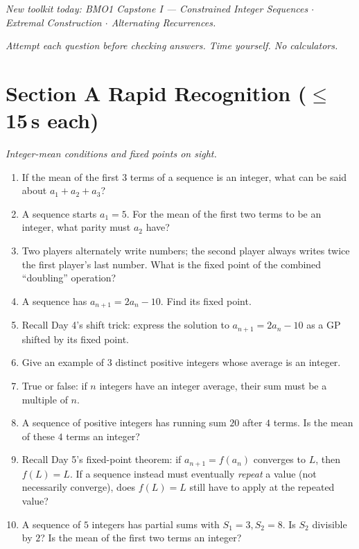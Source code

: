 \documentclass[11pt,a4paper]{article}
\begin{document}
\noindent\textit{New toolkit today: BMO1 Capstone I --- Constrained Integer Sequences $\cdot$ Extremal Construction $\cdot$ Alternating Recurrences.}

\vspace{2pt}
\noindent\textit{Attempt each question before checking answers. Time yourself. No calculators.}

\section*{Section A \quad Rapid Recognition \hfill{\normalfont\small($\leq$15\,s each)}}

\noindent\textit{Integer-mean conditions and fixed points on sight.}

\begin{enumerate}

\item If the mean of the first $3$ terms of a sequence is an integer, what can be said about $a_1+a_2+a_3$?

\item A sequence starts $a_1=5$. For the mean of the first two terms to be an integer, what parity must $a_2$ have?

\item Two players alternately write numbers; the second player always writes twice the first player's last number. What is the fixed point of the combined ``doubling'' operation?

\item A sequence has $a_{n+1}=2a_n-10$. Find its fixed point.

\item Recall Day 4's shift trick: express the solution to $a_{n+1}=2a_n-10$ as a GP shifted by its fixed point.

\item Give an example of $3$ distinct positive integers whose average is an integer.

\item True or false: if $n$ integers have an integer average, their sum must be a multiple of $n$.

\item A sequence of positive integers has running sum $20$ after $4$ terms. Is the mean of these $4$ terms an integer?

\item Recall Day 5's fixed-point theorem: if $a_{n+1}=f(a_n)$ converges to $L$, then $f(L)=L$. If a sequence instead must eventually \emph{repeat} a value (not necessarily converge), does $f(L)=L$ still have to apply at the repeated value?

\item A sequence of $5$ integers has partial sums with $S_1=3,S_2=8$. Is $S_2$ divisible by $2$? Is the mean of the first two terms an integer?

\end{enumerate}
\end{document}
